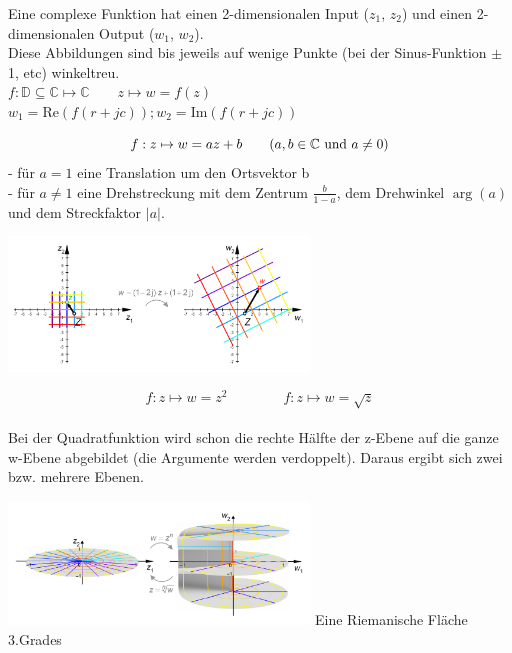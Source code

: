 	Eine complexe Funktion hat einen 2-dimensionalen Input ($z_1$, $z_2$) und einen
	2-dimensionalen Output ($w_1$, $w_2$). \\
	Diese Abbildungen sind bis jeweils auf wenige Punkte (bei der Sinus-Funktion
	$\pm$1, etc) winkeltreu.\\
	$ f: \mathbb{D} \subseteq \mathbb{C} \mapsto \mathbb{C} \qquad z  \mapsto w = f(z)$\\
	$w_1 = \text{Re}(f(r+jc)); w_2 = \text{Im}(f(r+jc))$ 
 

	  	\begin{minipage}{9cm}
		    $$ f : z \mapsto w = az + b \qquad (a, b \in \mathbb{C} \text{ und } a \neq0)\\$$
			- für $a = 1$ eine Translation um den Ortsvektor b \\
	    	- für $a \neq 1$ eine Drehstreckung mit dem Zentrum $\frac{b}{1-a}$, dem Drehwinkel $\arg(a)$ und dem Streckfaktor $|a|$.  
	    \end{minipage}
  		\hspace*{2cm}
  		\begin{minipage}{8cm}
      		\includegraphics[width=8cm]{./bilder/LineareFunktion.png}
    	\end{minipage}

  		\begin{minipage}{9cm}
      		$$ f : z \mapsto w = z^2 \qquad \qquad f : z \mapsto w = \sqrt{z} $$\\
    		Bei der Quadratfunktion wird schon die rechte Hälfte der z-Ebene auf die ganze w-Ebene abgebildet (die Argumente werden verdoppelt). Daraus ergibt sich zwei bzw. mehrere Ebenen.
    	\end{minipage}
  		\hspace*{2cm}
  		\begin{minipage}{8cm}
      		\includegraphics[width=8cm]{./bilder/RiemannischeFlaeche.png} 
      		Eine Riemanische Fläche 3.Grades
    	\end{minipage}

